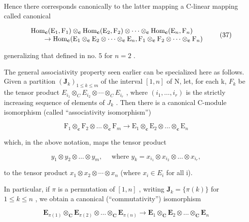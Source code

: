 Hence there corresponds canonically to the latter mapping a C-linear mapping called canonical

\[
\begin{array}{r l} & \operatorname{Hom} _ {\mathbf {c}} (\mathrm{E} _ {1}, \mathrm{F} _ {1}) \otimes_ {\mathbf {c}} \operatorname{Hom} _ {\mathbf {c}} (\mathrm{E} _ {2}, \mathrm{F} _ {2}) \otimes \dots \otimes_ {\mathbf {c}} \operatorname{Hom} _ {\mathbf {c}} (\mathrm{E} _ {n}, \mathrm{F} _ {n}) \\ & \qquad \to \operatorname{Hom} _ {\mathbf {c}} (\mathrm{E} _ {1} \otimes_ {\mathbf {c}} \mathrm{E} _ {2} \otimes \dots \otimes_ {\mathbf {c}} \mathrm{E} _ {n}, \mathrm{F} _ {1} \otimes_ {\mathbf {c}} \mathrm{F} _ {2} \otimes \dots \otimes_ {\mathbf {c}} \mathrm{F} _ {n}) \end{array}\tag{37}
\]

generalizing that defined in no. 5 for \(n = 2\) .

The general associativity property seen earlier can be specialized here as follows. Given a partition \((\mathbf{J}_{k})_{1\leqslant k\leqslant m}\) of the interval \([1,n]\) of N, let, for each k, \(F_{k}\) be the tensor product \(E_{i_{1}}\otimes_{C}E_{i_{2}}\otimes\cdots\otimes_{C}E_{i_{r}}\) , where \((i_{1},\ldots,i_{r})\) is the strictly increasing sequence of elements of \(J_{k}\) . Then there is a canonical C-module isomorphism (called ``associativity isomorphism'')

\[
\mathrm{F} _ {1} \otimes_ {\mathbf {c}} \mathrm{F} _ {2} \otimes \dots \otimes_ {\mathbf {c}} \mathrm{F} _ {m} \rightarrow \mathrm{E} _ {1} \otimes_ {\mathbf {c}} \mathrm{E} _ {2} \otimes \dots \otimes_ {\mathbf {c}} \mathrm{E} _ {n}
\]

which, in the above notation, maps the tensor product

\[
y _ {1} \otimes y _ {2} \otimes \dots \otimes y _ {m}, \quad \text { where } y _ {k} = x _ {i _ {1}} \otimes x _ {i _ {2}} \otimes \dots \otimes x _ {i _ {r}},
\]

to the tensor product \(x_{1} \otimes x_{2} \otimes \cdots \otimes x_{n}\) (where \(x_{i} \in E_{i}\) for all i).

In particular, if \(\pi\) is a permutation of \([1, n]\) , writing \(\mathbf{J}_k = \{\pi(k)\}\) for \(1 \leqslant k \leqslant n\) , we obtain a canonical (``commutativity'') isomorphism

\[
\mathbf {E} _ {\pi (1)} \otimes_ {\mathbf {C}} \mathbf {E} _ {\pi (2)} \otimes \dots \otimes_ {\mathbf {C}} \mathbf {E} _ {\pi (n)} \rightarrow \mathbf {E} _ {1} \otimes_ {\mathbf {C}} \mathbf {E} _ {2} \otimes \dots \otimes_ {\mathbf {C}} \mathbf {E} _ {n}
\]

